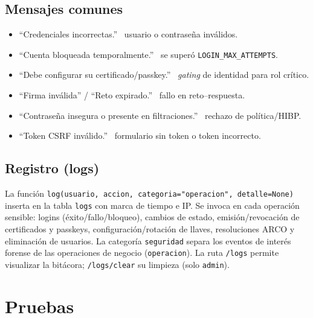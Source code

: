 \documentclass[10pt,letterpaper]{report}
\begin{document}
\section{Mensajes comunes}
\begin{itemize}
  \item ``Credenciales incorrectas.'' \textemdash\ usuario o contrase\~na inv\'alidos.
  \item ``Cuenta bloqueada temporalmente.'' \textemdash\ se super\'o \texttt{LOGIN\_MAX\_ATTEMPTS}.
  \item ``Debe configurar su certificado/passkey.'' \textemdash\ \emph{gating} de identidad para rol
  cr\'itico.
  \item ``Firma inv\'alida'' / ``Reto expirado.'' \textemdash\ fallo en reto--respuesta.
  \item ``Contrase\~na insegura o presente en filtraciones.'' \textemdash\ rechazo de pol\'itica/HIBP.
  \item ``Token CSRF inv\'alido.'' \textemdash\ formulario sin token o token incorrecto.
\end{itemize}

\section{Registro (logs)}
La funci\'on \texttt{log(usuario, accion, categoria="operacion", detalle=None)} inserta en la tabla
\texttt{logs} con marca de tiempo e IP. Se invoca en cada operaci\'on sensible: logins
(\'exito/fallo/bloqueo), cambios de estado, emisi\'on/revocaci\'on de certificados y passkeys,
configuraci\'on/rotaci\'on de llaves, resoluciones ARCO y eliminaci\'on de usuarios. La categor\'ia
\texttt{seguridad} separa los eventos de inter\'es forense de las operaciones de negocio
(\texttt{operacion}). La ruta \texttt{/logs} permite visualizar la bit\'acora; \texttt{/logs/clear} su
limpieza (solo \texttt{admin}).

\chapter{Pruebas}
\end{document}
